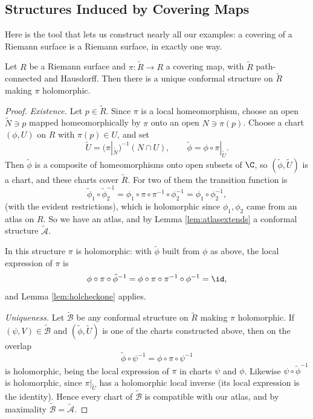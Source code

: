 \subsection{Structures Induced by Covering Maps}

Here is the tool that lets us construct nearly all our examples: a covering of a Riemann
surface is a Riemann surface, in exactly one way.

\begin{lemma}\label{lem:coverstructure}
	Let $R$ be a Riemann surface and $\pi : \tilde R \to R$ a covering map, with
	$\tilde R$ path-connected and Hausdorff. Then there is a unique conformal structure on
	$\tilde R$ making $\pi$ holomorphic.
\end{lemma}

\begin{proof}
	\emph{Existence.} Let $p \in \tilde R$. Since $\pi$ is a local homeomorphism, choose an
	open $\tilde N \ni p$ mapped homeomorphically by $\pi$ onto an open $N \ni \pi(p)$.
	Choose a chart $(\phi, U)$ on $R$ with $\pi(p) \in U$, and set
	$$
	\tilde U = (\pi|_{\tilde N})^{-1}(N \cap U), \qquad
	\tilde\phi = \phi \circ \pi|_{\tilde U}.
	$$
	Then $\tilde \phi$ is a composite of homeomorphisms onto open subsets of $\C$, so
	$(\tilde\phi, \tilde U)$ is a chart, and these charts cover $\tilde R$. For two of them
	the transition function is
	$$
	\tilde\phi_1 \circ \tilde\phi_2^{-1} = \phi_1 \circ \pi \circ \pi^{-1} \circ \phi_2^{-1} = \phi_1 \circ \phi_2^{-1},
	$$
	(with the evident restrictions), which is holomorphic since $\phi_1, \phi_2$ came from
	an atlas on $R$. So we have an atlas, and by Lemma \ref{lem:atlasextends} a conformal
	structure $\tilde{\mathcal{A}}$.

	In this structure $\pi$ is holomorphic: with $\tilde\phi$ built from $\phi$ as above,
	the local expression of $\pi$ is
	$$
	\phi \circ \pi \circ \tilde\phi^{-1} = \phi\circ \pi \circ \pi^{-1} \circ \phi^{-1} = \id,
	$$
	and Lemma \ref{lem:holcheckone} applies.

	\emph{Uniqueness.} Let $\tilde{\mathcal{B}}$ be any conformal structure on $\tilde R$
	making $\pi$ holomorphic. If $(\psi, V) \in \tilde{\mathcal{B}}$ and $(\tilde\phi, \tilde U)$
	is one of the charts constructed above, then on the overlap
	$$
	\tilde\phi \circ \psi^{-1} = \phi \circ \pi \circ \psi^{-1}
	$$
	is holomorphic, being the local expression of $\pi$ in charts $\psi$ and $\phi$.
	Likewise $\psi \circ \tilde\phi^{-1}$ is holomorphic, since $\pi|_{\tilde U}$ has a
	holomorphic local inverse (its local expression is the identity). Hence every chart of
	$\tilde{\mathcal{B}}$ is compatible with our atlas, and by maximality
	$\tilde{\mathcal{B}} = \tilde{\mathcal{A}}$.
\end{proof}

